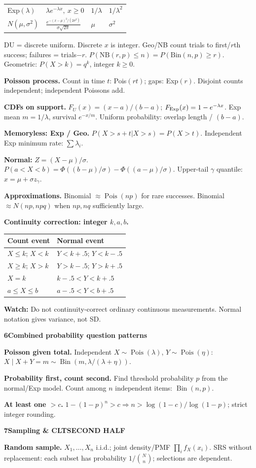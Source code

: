 \documentclass[a4paper,landscape]{article}
\newcommand{\head}[2][late]{\par\vspace{3pt}\noindent\colorbox{#1}{\parbox{\dimexpr\linewidth-6pt}{\color{white}\bfseries #2}}\par\vspace{1pt}}
\newcommand{\cue}[1]{\par\textbf{#1}\enspace}
\newcommand{\trap}[1]{\par{\color{alert}\textbf{Watch:} #1}}
\newcommand{\col}{\par\vfill\columnbreak}
\newcommand{\tblhead}[1]{\textbf{#1}}
\begin{document}
\begin{multicols*}{4}
\begin{tabular}{@{}L{.22\linewidth}L{.39\linewidth}L{.13\linewidth}L{.16\linewidth}@{}}
Exp\((\lambda)\) & \(\lambda e^{-\lambda x},\ x\ge0\) & \(1/\lambda\) & \(1/\lambda^2\)\\
\(N(\mu,\sigma^2)\) & \(\frac{e^{-(x-\mu)^2/(2\sigma^2)}}{\sigma\sqrt{2\pi}}\) & \(\mu\) & \(\sigma^2\)
\end{tabular}
DU = discrete uniform. Discrete \(x\) is integer. Geo/NB count trials to first/\(r\)th success; failures = trials\(-r\).
\(P(\mathrm{NB}(r,p)\le n)=P(\mathrm{Bin}(n,p)\ge r)\). Geometric: \(P(X>k)=q^k\), integer \(k\ge0\).
\cue{Poisson process.} Count in time \(t\): Pois\((rt)\); gaps: Exp\((r)\). Disjoint counts independent; independent Poissons add.
\cue{CDFs on support.} \(F_U(x)=(x-a)/(b-a)\); \(F_{\rm Exp}(x)=1-e^{-\lambda x}\). Exp mean \(m=1/\lambda\), survival \(e^{-x/m}\). Uniform probability: overlap length / \((b-a)\).
\cue{Memoryless: Exp / Geo.} \(P(X>s+t|X>s)=P(X>t)\). Independent Exp minimum rate: \(\sum\lambda_i\).
\cue{Normal:} \(Z=(X-\mu)/\sigma\).
\(P(a<X<b)=\Phi((b-\mu)/\sigma)-\Phi((a-\mu)/\sigma)\).
Upper-tail \(\gamma\) quantile: \(x=\mu+\sigma z_\gamma\).
\cue{Approximations.} Binomial \(\approx\operatorname{Pois}(np)\) for rare successes. Binomial \(\approx N(np,npq)\) when \(np,nq\) sufficiently large.
\cue{Continuity correction: integer \(k,a,b\).}
\begin{tabular}{@{}L{.44\linewidth}L{.50\linewidth}@{}}
\tblhead{Count event} & \tblhead{Normal event}\\\hline
\(X\le k\); \(X<k\) & \(Y<k+.5\); \(Y<k-.5\)\\
\(X\ge k\); \(X>k\) & \(Y>k-.5\); \(Y>k+.5\)\\
\(X=k\) & \(k-.5<Y<k+.5\)\\
\(a\le X\le b\) & \(a-.5<Y<b+.5\)
\end{tabular}
\trap{Do not continuity-correct ordinary continuous measurements. Normal notation gives variance, not SD.}
\head[early]{6\quad Combined probability question patterns}
\cue{Poisson given total.} Independent \(X\sim\operatorname{Pois}(\lambda)\), \(Y\sim\operatorname{Pois}(\eta)\):
\(X\mid X+Y=m\sim\operatorname{Bin}(m,\lambda/(\lambda+\eta))\).
\cue{Probability first, count second.} Find threshold probability \(p\) from the normal/Exp model. Count among \(n\) independent items: \(\operatorname{Bin}(n,p)\).
\cue{At least one \(>c\).} \(1-(1-p)^n>c\Rightarrow n>\log(1-c)/\log(1-p)\); strict integer rounding.
\col
\setlength{\parskip}{1.2pt}
\head{7\quad Sampling \& CLT\hfill SECOND HALF}
\cue{Random sample.} \(X_1,\ldots,X_n\) i.i.d.; joint density/PMF \(\prod_i f_X(x_i)\).
SRS without replacement: each subset has probability \(1/{N\choose n}\); selections are dependent.

\end{multicols*}
\end{document}
